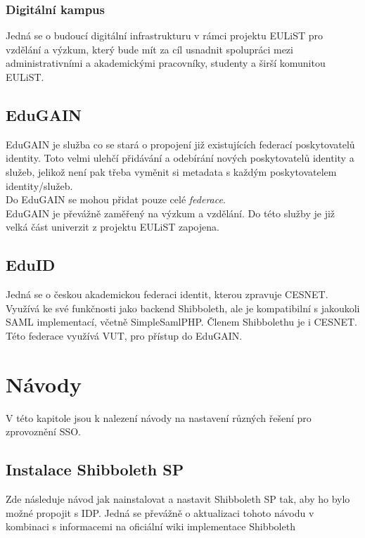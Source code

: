 \subsection{Digitální kampus}

Jedná se o budoucí digitální infrastrukturu v rámci projektu EULiST pro vzdělání a výzkum, který bude mít za cíl usnadnit spolupráci mezi administrativními a akademickými pracovníky, studenty a širší komunitou EULiST.\cite{digitalcampus}

\section{EduGAIN} %

EduGAIN je služba co se stará o propojení již existujících federací poskytovatelů identity. Toto velmi ulehčí přidávání a odebírání nových poskytovatelů identity a služeb, jelikož není pak třeba vyměnit si metadata s každým poskytovatelem identity/služeb. \\Do EduGAIN se mohou přidat pouze celé \emph{federace}. \cite{edugainWikipedie}\cite{edugain}\\
EduGAIN je převážně zaměřený na výzkum a vzdělání.
Do této služby je již velká část univerzit z projektu EULiST zapojena.

\section{EduID} %

Jedná se o českou akademickou federaci identit, kterou zpravuje CESNET. 
Využívá ke své funkčnosti jako backend Shibboleth, ale je kompatibilní s jakoukoli SAML implementací, včetně SimpleSamlPHP. Členem Shibbolethu je i CESNET.\cite{eduid}
\\
Této federace využívá VUT, pro přístup do EduGAIN.

\chapter{Návody}
\label{návod}

V této kapitole jsou k nalezení návody na nastavení různých řešení pro zprovoznění SSO.

\section{Instalace Shibboleth SP} \label{instalaceShibboleth}

Zde následuje návod jak nainstalovat a nastavit Shibboleth SP tak, aby ho bylo možné propojit s IDP. Jedná se převážně o aktualizaci tohoto návodu\cite{shibbolethSpInstallation} v kombinaci s informacemi na oficiální wiki implementace Shibboleth\cite{shibbolethWikiSP}

